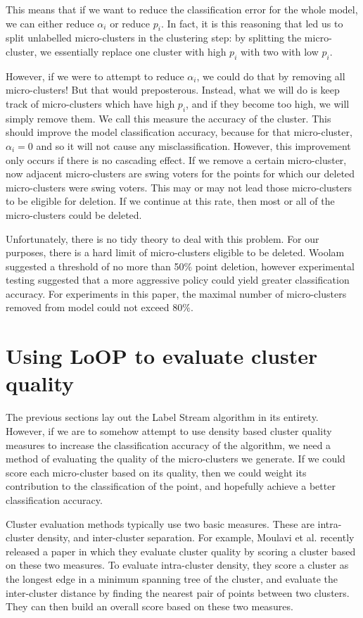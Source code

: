 \documentclass[12pt,a4paper,oneside]{report}
\begin{document}
This means that if we want to reduce the classification error for the whole model, we can either reduce $\alpha_i$ or reduce $p_i$. In fact, it is this reasoning that led us to split unlabelled micro-clusters in the clustering step: by splitting the micro-cluster, we essentially replace one cluster with high $p_i$ with two with low $p_i$. 

However, if we were to attempt to reduce $\alpha_i$, we could do that by removing all micro-clusters! But that would preposterous. Instead, what we will do is keep track of micro-clusters which have high $p_i$, and if they become too high, we will simply remove them. We call this measure the accuracy of the cluster. This should improve the model classification accuracy, because for that micro-cluster, $\alpha_i = 0$ and so it will not cause any misclassification. However, this improvement only occurs if there is no cascading effect. If we remove a certain micro-cluster, now adjacent micro-clusters are swing voters for the points for which our deleted micro-clusters were swing voters. This may or may not lead those micro-clusters to be eligible for deletion. If we continue at this rate, then most or all of the micro-clusters could be deleted. 

Unfortunately, there is no tidy theory to deal with this problem. For our purposes, there is a hard limit of micro-clusters eligible to be deleted. Woolam suggested a threshold of no more than 50$\%$ point deletion, however experimental testing suggested that a more aggressive policy could yield greater classification accuracy. For experiments in this paper, the maximal number of micro-clusters removed from model could not exceed 80$\%$.

\section*{Using LoOP to evaluate cluster quality}

The previous sections lay out the Label Stream algorithm in its entirety. However, if we are to somehow attempt to use density based cluster quality measures to increase the classification accuracy of the algorithm, we need a method of evaluating the quality of the micro-clusters we generate. If we could score each micro-cluster based on its quality, then we could weight its contribution to the classification of the point, and hopefully achieve a better classification accuracy. 

Cluster evaluation methods typically use two basic measures. These are intra-cluster density, and inter-cluster separation. For example, Moulavi et al\cite{DBCV}. recently released a paper in which they evaluate cluster quality by scoring a cluster based on these two measures. To evaluate intra-cluster density, they score a cluster as the longest edge in a minimum spanning tree of the cluster, and evaluate the inter-cluster distance by finding the nearest pair of points between two clusters. They can then build an overall score based on these two measures. 
\end{document}
